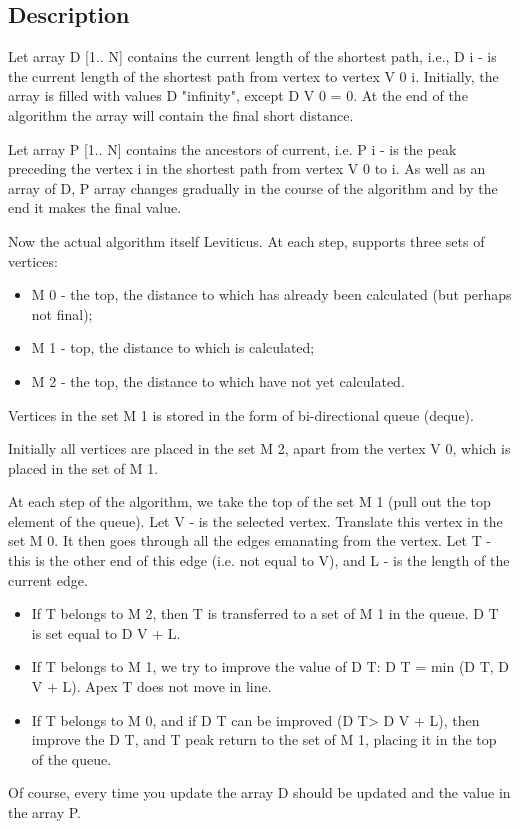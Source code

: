 \subsection{ Description }
Let array D [1.. N] contains the current length of the shortest path, i.e., D i - is the current length of the shortest path from vertex to vertex V 0 i. Initially, the array is filled with values ​​D "infinity", except D V 0 = 0. At the end of the algorithm the array will contain the final short distance.

Let array P [1.. N] contains the ancestors of current, i.e. P i - is the peak preceding the vertex i in the shortest path from vertex V 0 to i. As well as an array of D, P array changes gradually in the course of the algorithm and by the end it makes the final value.

Now the actual algorithm itself Leviticus. At each step, supports three sets of vertices:

\begin{itemize} \item M 0 - the top, the distance to which has already been calculated (but perhaps not final); \item M 1 - top, the distance to which is calculated; \item M 2 - the top, the distance to which have not yet calculated. \end{itemize}
Vertices in the set M 1 is stored in the form of bi-directional queue (deque).

Initially all vertices are placed in the set M 2, apart from the vertex V 0, which is placed in the set of M 1.

At each step of the algorithm, we take the top of the set M 1 (pull out the top element of the queue). Let V - is the selected vertex. Translate this vertex in the set M 0. It then goes through all the edges emanating from the vertex. Let T - this is the other end of this edge (i.e. not equal to V), and L - is the length of the current edge.

\begin{itemize} \item If T belongs to M 2, then T is transferred to a set of M 1 in the queue. D T is set equal to D V + L. \item If T belongs to M 1, we try to improve the value of D T: D T = min (D T, D V + L). Apex T does not move in line. \item If T belongs to M 0, and if D T can be improved (D T> D V + L), then improve the D T, and T peak return to the set of M 1, placing it in the top of the queue. \end{itemize}
Of course, every time you update the array D should be updated and the value in the array P.

